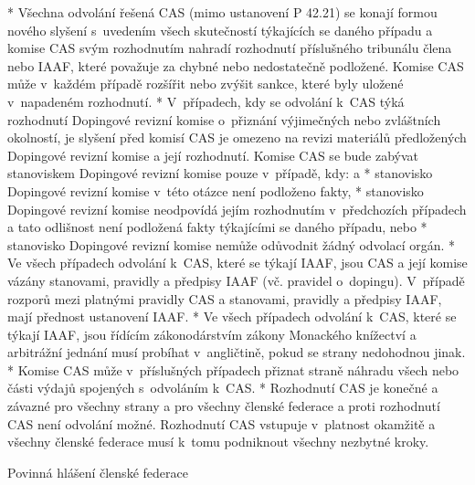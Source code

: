 * Všechna odvolání řešená CAS (mimo ustanovení P 42.21)  se konají formou nového slyšení s~uvedením všech skutečností týkajících se daného případu a komise CAS svým rozhodnutím nahradí rozhodnutí příslušného tribunálu člena nebo IAAF, které považuje za chybné nebo nedostatečně podložené. Komise CAS může v~každém případě rozšířit nebo zvýšit sankce, které byly uložené v~napadeném rozhodnutí.
* V~případech, kdy se odvolání k~CAS týká rozhodnutí Dopingové revizní komise o~přiznání výjimečných nebo zvláštních okolností, je slyšení před komisí CAS je omezeno na revizi materiálů předložených Dopingové revizní komise a její rozhodnutí. Komise CAS se bude zabývat stanoviskem Dopingové revizní komise pouze v~případě, kdy:
  \begitems \style a
  * stanovisko Dopingové revizní komise v~této otázce není podloženo fakty,
  * stanovisko Dopingové revizní komise neodpovídá jejím rozhodnutím v~předchozích případech a tato odlišnost není podložená fakty týkajícími se daného případu, nebo
  * stanovisko Dopingové revizní komise nemůže odůvodnit žádný odvolací orgán.
  \enditems
* Ve všech případech odvolání k~CAS, které se týkají IAAF, jsou CAS a její komise vázány stanovami, pravidly a předpisy IAAF (vč. pravidel o~dopingu). V~případě rozporů mezi platnými pravidly CAS a stanovami, pravidly a předpisy IAAF, mají přednost ustanovení IAAF.
* Ve všech případech odvolání k~CAS, které se týkají IAAF, jsou řídícím zákonodárstvím zákony Monackého knížectví a arbitrážní jednání musí probíhat v~angličtině, pokud se strany nedohodnou jinak.
* Komise CAS může v~příslušných případech přiznat straně náhradu všech nebo části  výdajů spojených s~odvoláním k~CAS.
* Rozhodnutí CAS je konečné a závazné pro všechny strany a pro všechny členské federace a proti rozhodnutí CAS není odvolání možné. Rozhodnutí CAS vstupuje v~platnost okamžitě a všechny členské federace musí k~tomu podniknout všechny nezbytné kroky.
\enditems

\secc Povinná hlášení členské federace

